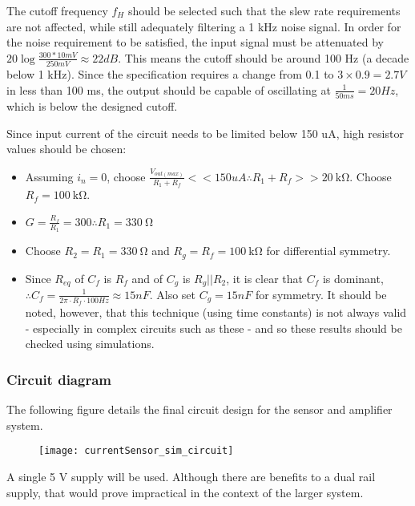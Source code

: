 The cutoff frequency $f_H$ should be selected such that the slew rate requirements are not affected, while still adequately filtering a 1 kHz noise signal. In order for the noise requirement
to be satisfied, the input signal must be attenuated by $20 \log{\frac{300 * 10 mV}{250 mV}} \approx 22 dB$. This means the cutoff should be around 100 Hz (a decade below 1 kHz).
Since the specification requires a change from 0.1 to $3 \times 0.9 = 2.7 V$ in less than 100 ms, the output should be capable of oscillating at $\frac{1}{50 ms} = 20 Hz$, which is below the designed cutoff.

Since input current of the circuit needs to be limited below 150 uA, high resistor values should be chosen:
\begin{itemize}
  \item Assuming $i_n = 0$, choose $\frac{V_{out(max)}}{R_1 + R_f} << 150 uA \therefore R_1 + R_f >> \SI{20}{\kilo\ohm}$. Choose $R_f = \SI{100}{\kilo\ohm}$.
  \item $G = \frac{R_f}{R_1} = 300 \therefore R_1 = \SI{330}{\ohm}$
  \item Choose $R_2 = R_1 = \SI{330}{\ohm}$ and $R_g = R_f = \SI{100}{\kilo\ohm}$ for differential symmetry.
  \item Since $R_{eq}$ of $C_f$ is $R_f$ and of $C_g$ is $R_g || R_2$, it is clear that $C_f$ is dominant, $\therefore C_f = \frac{1}{2 \pi \cdot R_f \cdot 100 Hz} \approx 15 nF$. Also set $C_g = 15nF$ for symmetry.
        It should be noted, however, that this technique (using time constants) is not always valid - especially in complex circuits such as these - and so these results should be checked using simulations.
\end{itemize}

\subsubsection{Circuit diagram}\label{sec:current_sensor_circuit}
The following figure details the final circuit design for the sensor and amplifier system.

\begin{figure}[h!]
  \centering
  \texttt{[image: currentSensor\_sim\_circuit]}
  \label{fig:circuit-diagram}
\end{figure}

A single 5 V supply will be used. Although there are benefits to a dual rail supply, that would prove impractical in the context of the larger system.

\pagebreak
